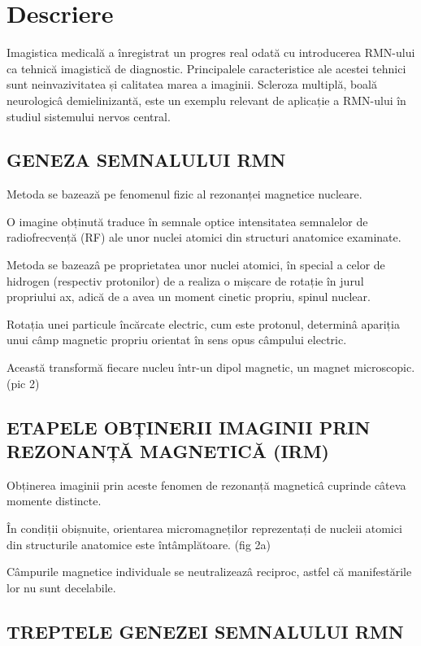 \documentclass{article}
\begin{document}
    \section{Descriere}

    Imagistica medicală a înregistrat un progres real odată cu introducerea RMN-ului ca tehnică imagistică de diagnostic. Principalele caracteristice ale acestei tehnici sunt neinvazivitatea și calitatea marea a imaginii. Scleroza multiplă, boală neurologicâ demielinizantă, este un exemplu relevant de aplicație a RMN-ului în studiul sistemului nervos central. 
 
    \subsection{GENEZA SEMNALULUI RMN}


    Metoda se bazează pe fenomenul fizic al rezonanței magnetice nucleare. 

    O imagine obținută traduce în semnale optice intensitatea semnalelor de radiofrecvență (RF) ale unor nuclei atomici din structuri anatomice examinate. 

    Metoda se bazeazâ pe proprietatea unor nuclei atomici, în special a celor de hidrogen (respectiv protonilor) de a realiza o mișcare de rotație în jurul propriului ax, adică de a avea un moment cinetic propriu, spinul nuclear.

    Rotația unei particule încărcate electric, cum este protonul, determinâ apariția unui câmp magnetic propriu orientat în sens opus câmpului electric.

    Această transformă fiecare nucleu într-un dipol magnetic, un magnet microscopic. (pic 2) 


\subsection{ETAPELE OBȚINERII IMAGINII PRIN REZONANȚĂ MAGNETICĂ (IRM)}


Obținerea imaginii prin aceste fenomen de rezonanță magneticâ cuprinde câteva momente distincte.

În condiții obișnuite, orientarea micromagneților reprezentați de nucleii atomici din structurile anatomice este întâmplătoare. (fig 2a)

Câmpurile magnetice individuale se neutralizeazâ reciproc, astfel că manifestările lor nu sunt decelabile.


\subsection{TREPTELE GENEZEI SEMNALULUI RMN}
\end{document}
